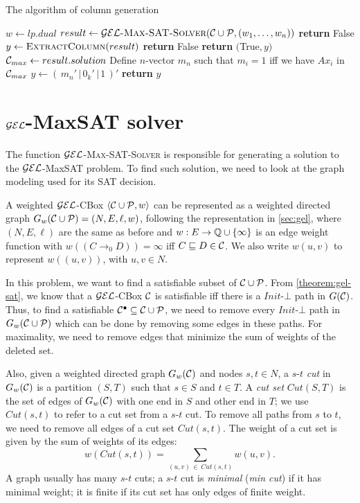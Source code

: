 \begin{algorithm}
	\caption{The algorithm of column generation}
	\label{alg:gen-col}
	\begin{algorithmic}[1]
		\State $w \gets lp.dual$
		\State $result \gets \Call{$\gel$-Max-SAT-Solver}{\CC \cup \PP, (w_1, \dots, w_n)}$
		\State \textbf{return} False
		\EndIf
		\Statex
		\State $y \gets \Call{ExtractColumn}{result}$
		\State \textbf{return} False
		\EndIf
		\Statex
		\State \textbf{return} $($True$, y)$
		\EndFunction
		\Statex
		\State $\mathcal{C}_{max} \gets result.solution$
		\State Define $n$-vector $m_n$ such that $m_i = 1$ iff we have $Ax_i$ in $\mathcal{C}_{max}$
		\State $y \gets (\, m_n' \, | \, 0_k' \, |\, 1 \,)'$
		\State \textbf{return} $y$
		\EndFunction
	\end{algorithmic}
\end{algorithm}


\section{\texorpdfstring{$\mathcal{GEL}$}{GEL}-MaxSAT solver}

The function $\mathcal{GEL}$\textsc{-Max-SAT-Solver} is responsible for generating a solution to the $\mathcal{GEL}$-MaxSAT problem. To find such solution, we need to look at the graph modeling used for its SAT decision.

A weighted $\mathcal{GEL}$-CBox $\langle\mathcal{C}\cup\mathcal{P}, w\rangle$ can be represented as a weighted directed graph $G_w(\mathcal{C}\cup\mathcal{P}) = (N, E, \ell, w)$, following the representation in \autoref{sec:gel}, where $(N, E, \ell)$ are the same as before and $w: E \to \mathbb{Q} \cup \{\infty\}$ is an edge weight function with $w\left(\left(C \to_0 D\right)\right) = \infty$ iff $C \sqsubseteq D \in \mathcal{C}$. We also write $w(u, v)$ to represent $w((u, v))$, with $u, v \in N$.

In this problem, we want to find a satisfiable subset of $\mathcal{C} \cup \mathcal{P}$. From \autoref{theorem:gel-sat}, we know that a $\mathcal{GEL}$-CBox $\mathcal{C}$ is satisfiable iff there is a $Init$-$\bot$ path in $G(\mathcal{C})$. Thus, to find a satisfiable $\mathcal{C}^\bullet \subseteq \mathcal{C} \cup \mathcal{P}$, we need to remove every $Init$-$\bot$ path in $G_w(\mathcal{C} \cup \mathcal{P})$ which can be done by removing some edges in these paths. For maximality, we need to remove edges that minimize the sum of weights of the deleted set.

Also, given a weighted directed graph $G_w(\mathcal{C})$ and nodes $s, t \in N$, a $s$-$t$ \emph{cut} in $G_w(\mathcal{C})$ is a partition $(S, T)$ such that $s \in S$ and $t \in T$. A \emph{cut set} $Cut(S, T)$ is the set of edges of $G_w(\mathcal{C})$ with one end in $S$ and other end in $T$; we use $Cut(s, t)$ to refer to a cut set from a $s$-$t$ cut.  To remove all paths from $s$ to $t$, we need to remove all edges of a cut set $Cut(s, t)$. The weight of a cut set is given by the sum of weights of its edges:
\[
	w(Cut(s, t)) = \sum_{(u, v) \, \in \, Cut(s, t)} w(u, v).
\]
A graph usually has many $s$-$t$ cuts; a $s$-$t$ cut is \emph{minimal} (\emph{min cut}) if it has minimal weight; it is finite if its cut set has only edges of finite weight.

